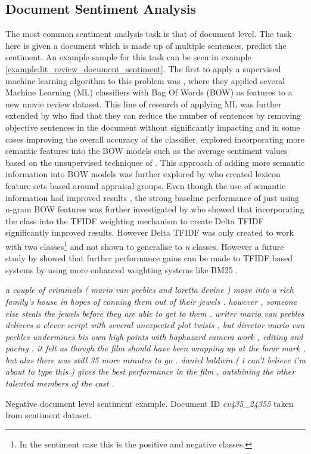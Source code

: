 \subsection{Document Sentiment Analysis}
The most common sentiment analysis task is that of document level. The task here is given a document which is made up of multiple sentences, predict the sentiment. An example sample for this task can be seen in example \ref{example:lit_review_document_sentiment}. The first to apply a supervised machine learning algorithm to this problem was \citet{pang-etal-2002-thumbs}, where they applied several Machine Learning (ML) classifiers with Bag Of Words (BOW) as features to a new movie review dataset. This line of research of applying ML was further extended by \citet{pang-lee-2004-sentimental} who find that they can reduce the number of sentences by removing objective sentences in the document without significantly impacting and in some cases improving the overall accuracy of the classifier. \citet{mullen-collier-2004-sentiment} explored incorporating more semantic features into the BOW models such as the average sentiment values based on the unsupervised techniques of \citet{turney-2002-thumbs}. This approach of adding more semantic information into BOW models was further explored by \citet{whitelaw2005using} who created lexicon feature sets based around appraisal groups. Even though the use of semantic information had improved results \citep{whitelaw2005using}, the strong baseline performance of just using n-gram BOW features was further investigated by \citet{martineau2009delta} who showed that incorporating the class into the TFIDF weighting mechanism \citep{jones1972statistical} to create Delta TFIDF significantly improved results. However Delta TFIDF was only created to work with two classes\footnote{In the sentiment case this is the positive and negative classes.} and not shown to generalise to \textit{n} classes. However a future study by \citet{paltoglou-thelwall-2010-study} showed that further performance gains can be made to TFIDF based systems by using more enhanced weighting systems like BM25 \citep{robertson1995okapi}.

\begin{example}
\textit{a couple of criminals ( mario van peebles and loretta devine ) move into a rich family's house in hopes of conning them out of their jewels . however , someone else steals the jewels before they are able to get to them . writer mario van peebles delivers a clever script with several unexpected plot twists , but director mario van peebles undermines his own high points with haphazard camera work , editing and pacing . it felt as though the film should have been wrapping up at the hour mark , but alas there was still 35 more minutes to go . daniel baldwin ( i can't believe i'm about to type this ) gives the best performance in the film , outshining the other talented members of the cast .}
\caption{Negative document level sentiment example. Document ID \textit{cv435\_24355} taken from \citet{pang-etal-2002-thumbs} sentiment dataset.}
\label{example:lit_review_document_sentiment}
\end{example}

